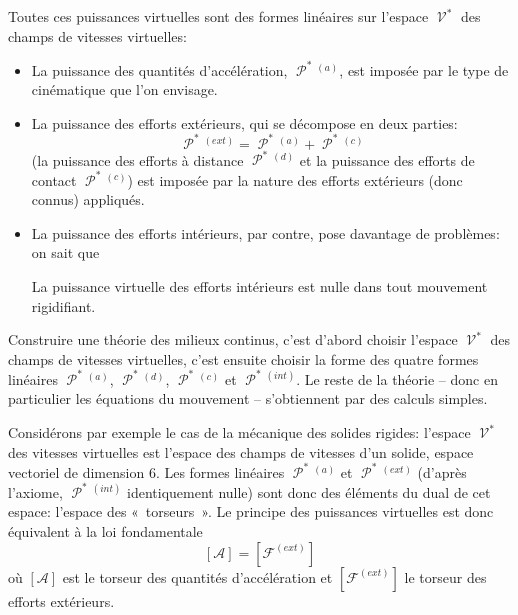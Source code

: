 Toutes ces puissances virtuelles sont des formes linéaires sur l'espace $\mathop{\mathcal{V}}^{\ast}$ des champs de vitesses virtuelles:
\begin{itemize}
    \item La puissance des quantités d'accélération, $\mathop{\mathcal{P}}^{\ast}{\!}^{(a)}$, est imposée par le type de cinématique que l'on envisage.
    \item La puissance des efforts extérieurs, qui se décompose en deux parties:
        \begin{equation}
            \mathop{\mathcal{P}}^{\ast}{\!}^{(ext)} = \mathop{\mathcal{P}}^{\ast}{\!}^{(a)} + \mathop{\mathcal{P}}^{\ast}{\!}^{(c)}
            \label{eq:Ch01-031}
        \end{equation}
        (la puissance des efforts à distance $\mathop{\mathcal{P}}^{\ast}{\!}^{(d)}$ et la puissance des efforts de contact $\mathop{\mathcal{P}}^{\ast}{\!}^{(c)}$) est imposée par la nature des efforts extérieurs (donc connus) appliqués.
    \item La puissance des efforts intérieurs, par contre, pose davantage de problèmes:\\
        on sait que
        \begin{Axiome}
            La puissance virtuelle des efforts intérieurs est nulle dans tout mouvement rigidifiant.
        \end{Axiome}
\end{itemize}

Construire une théorie des milieux continus, c'est d'abord choisir l'espace $\mathop{\mathcal{V}}^{\ast}$ des champs de vitesses virtuelles, c'est ensuite choisir la forme des quatre formes linéaires $\mathop{\mathcal{P}}^{\ast}{\!}^{(a)}$, $\mathop{\mathcal{P}}^{\ast}{\!}^{(d)}$, $\mathop{\mathcal{P}}^{\ast}{\!}^{(c)}$ et $\mathop{\mathcal{P}}^{\ast}{\!}^{(int)}$.
Le reste de la théorie -- donc en particulier les équations du mouvement -- s'obtiennent par des calculs simples.

Considérons par exemple le cas de la mécanique des solides rigides: l'espace $\mathop{\mathcal{V}}^{\ast}$ des vitesses virtuelles est l'espace des champs de vitesses d'un solide, espace vectoriel de dimension 6.
Les formes linéaires $\mathop{\mathcal{P}}^{\ast}{\!}^{(a)}$ et $\mathop{\mathcal{P}}^{\ast}{\!}^{(ext)}$ (d'après l'axiome, $\mathop{\mathcal{P}}^{\ast}{\!}^{(int)}$ identiquement nulle) sont donc des éléments du dual de cet espace: l'espace des «~torseurs~».
Le principe des puissances virtuelles est donc équivalent à la loi fondamentale
\begin{equation}
    \left[ \mathcal{A} \right] = \left[ \mathcal{F}^{(ext)} \right]
    \label{eq:Ch01-032}
\end{equation}
où $\left[ \mathcal{A} \right]$ est le torseur des quantités d'accélération et $\left[ \mathcal{F}^{(ext)} \right]$ le torseur des efforts extérieurs.

